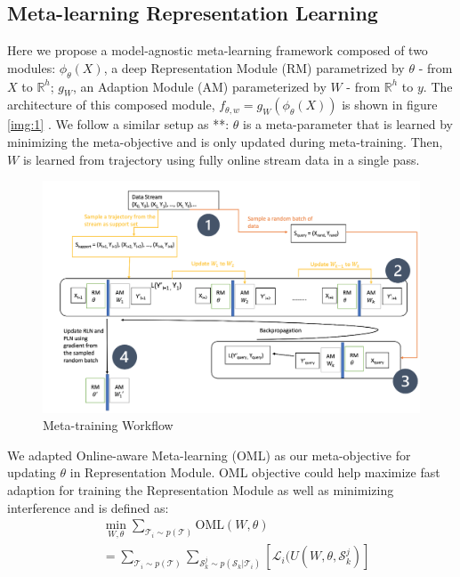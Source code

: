 \subsection{Meta-learning Representation Learning}
\label{sec:mlr}
Here we propose a model-agnostic meta-learning framework composed of two modules: $\phi_\theta(X)$, a deep Representation Module (RM) parametrized by $\theta$ - from $X$ to $\mathbb{R} ^ {h}$; $g_W$, an Adaption Module (AM) parameterized by $W$ - from $\mathbb{R} ^ {h}$ to $y$. The architecture of this composed module, $f_{\theta, w} = g_W(\phi_\theta(X))$ is shown in figure \ref{img:1} . We follow a similar setup as **: $\theta$ is a meta-parameter that is learned by minimizing the meta-objective and is only updated during meta-training. Then, $W$ is learned from trajectory using fully online stream data in a single pass.
\begin{figure}[ht]
\centering
    \includegraphics[scale=0.6]{imgs/meta-training.png}
    \caption{Meta-training Workflow}
    \label{img:2}
\end{figure}

We adapted Online-aware Meta-learning (OML) as our meta-objective for updating $\theta$ in Representation Module. OML objective could help maximize fast adaption for training the Representation Module as well as minimizing interference and is defined as:
\begin{equation}
    \begin{split}
       &\min_{W, \theta} \sum_{\mathcal{T}_i \sim p(\mathcal{T})} \mathrm{OML}(W, \theta) \\
       &= \sum_{\mathcal{T}_i \sim p(\mathcal{T})} \sum_{\mathcal{S}_k ^ j \sim p(\mathcal{S}_k | \mathcal{T}_i)} [\mathcal{L}_i (U(W, \theta, \mathcal{S}_k ^ j)]
   \end{split}
\end{equation}

